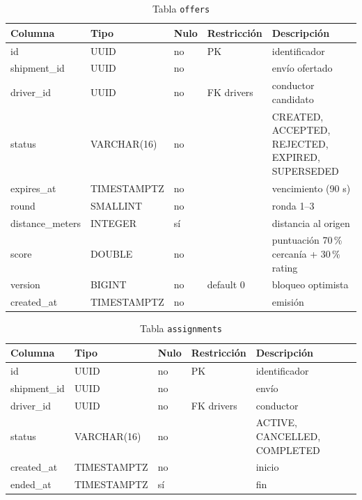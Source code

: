 \documentclass[10pt,letterpaper,twocolumn,oneside]{report}
\newcommand{\pkg}[1]{\texttt{#1}}
\begin{document}
\begin{longtable}{@{}L{3.2cm}L{3.2cm}L{1.1cm}L{3.4cm}L{3.9cm}@{}}
\caption{Tabla \pkg{offers}}\\
\toprule
\textbf{Columna} & \textbf{Tipo} & \textbf{Nulo} & \textbf{Restricción} & \textbf{Descripción}\\
\midrule
\endhead
id & UUID & no & PK & identificador\\
shipment\_id & UUID & no & & envío ofertado\\
driver\_id & UUID & no & FK drivers & conductor candidato\\
status & VARCHAR(16) & no & & CREATED, ACCEPTED, REJECTED, EXPIRED, SUPERSEDED\\
expires\_at & TIMESTAMPTZ & no & & vencimiento (90 s)\\
round & SMALLINT & no & & ronda 1–3\\
distance\_meters & INTEGER & sí & & distancia al origen\\
score & DOUBLE & no & & puntuación 70\,\% cercanía + 30\,\% rating\\
version & BIGINT & no & default 0 & bloqueo optimista\\
created\_at & TIMESTAMPTZ & no & & emisión\\
\bottomrule
\end{longtable}

\begin{longtable}{@{}L{3.2cm}L{3.2cm}L{1.1cm}L{3.4cm}L{3.9cm}@{}}
\caption{Tabla \pkg{assignments}}\\
\toprule
\textbf{Columna} & \textbf{Tipo} & \textbf{Nulo} & \textbf{Restricción} & \textbf{Descripción}\\
\midrule
\endhead
id & UUID & no & PK & identificador\\
shipment\_id & UUID & no & & envío\\
driver\_id & UUID & no & FK drivers & conductor\\
status & VARCHAR(16) & no & & ACTIVE, CANCELLED, COMPLETED\\
created\_at & TIMESTAMPTZ & no & & inicio\\
ended\_at & TIMESTAMPTZ & sí & & fin\\
\bottomrule
\end{longtable}
\end{document}
